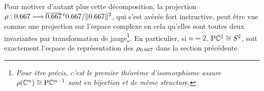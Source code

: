 Pour motiver d'autant plus cette décomposition, la projection $\rho : \x \lr \congu{\x}\,^t\x / \|\x\|^2$, qui s'est avérée fort instructive, peut être vue comme une projection sur l'espace complexe en cela qu'elles sont toutes deux invariantes par transformation de jauge\footnote{\itshape
	Pour être précis, c'est le premier théorème d'isomorphisme assure $\rho(\mathbb{C}^n) \cong\text{\normalfont P}\mathbb{C}^{n-1}$ sont en bijection et de même structure.}.
En particulier, si $n=2$, $\text{\normalfont P}\mathbb{C}^{1}\cong S^{2}$, soit exactement l'espace de représentation des $\rho_{\x}$ dans la section précédente.
